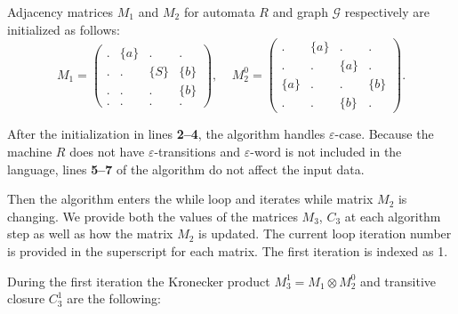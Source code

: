 Adjacency matrices $M_1$ and $M_2$ for automata $R$ and graph $\mathcal{G}$ respectively are initialized as follows:
    $$
    M_1 =
    \begin{pmatrix}
    . & \{a\} & . & .     \\
    . & . & \{S\} & \{b\} \\
    . & . & . & \{b\}     \\
    . & . & . & .
    \end{pmatrix}
    ,~~~~~
    M_2^0 =
    \begin{pmatrix}
    . & \{a\} & . & .     \\
    . & . & \{a\} & .     \\
    \{a\} & . & . & \{b\} \\
    . & . & \{b\} & .
    \end{pmatrix}.
    $$

After the initialization in lines \textbf{2--4}, the algorithm handles $\varepsilon$-case.
Because the machine $R$ does not have $\varepsilon$-transitions and $\varepsilon$-word is not included in the language, lines \textbf{5--7} of the algorithm do not affect the input data.

Then the algorithm enters the while loop and iterates while matrix $M_2$ is changing.
We provide both the values of the matrices $M_3$, $C_3$ at each algorithm step as well as how the matrix $M_2$ is updated.
The current loop iteration number is provided in the superscript for each matrix.
The first iteration is indexed as 1.

During the first iteration the Kronecker product $M_3^1 = M_1 \otimes M_2^0$ and transitive closure $C_3^1$ are the following:


